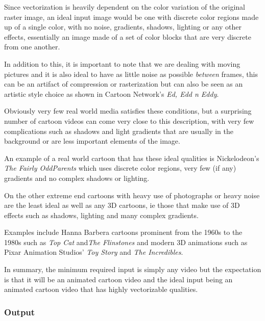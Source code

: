 \documentclass[12pt]{article}
\newcommand{\sentence}{} %
\newcommand{\italic}[1]{\textit{#1}}
\begin{document}
    \bigskip
    Since vectorization is heavily dependent on the color variation of the original raster image, an ideal input
    image would be one with discrete color regions made up of a single color, with no noise, gradients, shadows,
    lighting or any other effects, essentially an image made of a set of color blocks that are very discrete from one
    another.
    \sentence
    In addition to this, it is important to note that we are dealing with moving pictures and it is also ideal to
    have as little noise as possible \italic{between} frames, this can be an artifact of compression or
    rasterization but can also be seen as an artistic style choice as shown in Cartoon Network's
    \italic{Ed, Edd n Eddy}.
    \sentence
    Obviously very few real world media satisfies these conditions, but a surprising number of cartoon videos can come
    very close to this description, with very few complications such as shadows and light gradients that are usually
    in the background or are less important elements of the image.
    \sentence
    An example of a real world cartoon that has these ideal qualities is Nickelodeon's \italic{The Fairly OddParents}
    which uses discrete color regions, very few (if any) gradients and no complex shadows or lighting.
    \sentence
    On the other extreme end cartoons with heavy use of photographs or heavy noise are the least ideal as well as
    any 3D cartoons, ie those that make use of 3D effects such as shadows, lighting and many complex gradients.
    \sentence
    Examples include Hanna Barbera cartoons prominent from the 1960s to the 1980s such as \italic{Top Cat}
    and\italic{The Flinstones} and modern 3D animations such as Pixar Animation Studios'
    \italic{Toy Story} and \italic{The Incredibles}.
    \sentence
    In summary, the minimum required input is simply any video but the expectation is that it will be an
    animated cartoon video and the ideal input being an animated cartoon video that has highly vectorizable qualities.


    \subsubsection{Output}\label{subsubsec:output}
\end{document}
